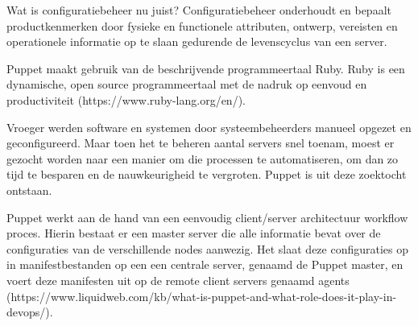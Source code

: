Wat is configuratiebeheer nu juist? Configuratiebeheer onderhoudt en bepaalt productkenmerken door fysieke en functionele attributen, ontwerp, vereisten en operationele informatie op te slaan gedurende de levenscyclus van een server. 

Puppet maakt gebruik van de beschrijvende programmeertaal Ruby. Ruby is een dynamische, open source programmeertaal met de nadruk op eenvoud en productiviteit (https://www.ruby-lang.org/en/).

Vroeger werden software en systemen door systeembeheerders manueel opgezet en geconfigureerd. Maar toen het te beheren aantal servers snel toenam, moest er gezocht worden naar een manier om die processen te automatiseren, om dan zo tijd te besparen en de nauwkeurigheid te vergroten. Puppet is uit deze zoektocht ontstaan.

Puppet werkt aan de hand van een eenvoudig client/server architectuur workflow proces. Hierin bestaat er een master server die alle informatie bevat over de configuraties van de verschillende nodes aanwezig. Het slaat deze configuraties op in manifestbestanden op een een centrale server, genaamd de Puppet master, en voert deze manifesten uit op de remote client servers genaamd agents (https://www.liquidweb.com/kb/what-is-puppet-and-what-role-does-it-play-in-devops/).

